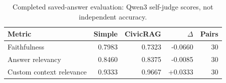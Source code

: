 \begin{table}[htbp]\centering\small
\caption{Completed saved-answer evaluation: Qwen3 self-judge scores, not independent accuracy.}\label{tab:ragas-final}
\begin{tabularx}{\linewidth}{Xrrrr}\toprule
Metric & Simple & CivicRAG & $\Delta$ & Pairs\\\midrule
Faithfulness & 0.7983 & 0.7323 & -0.0660 & 30\\
Answer relevancy & 0.8460 & 0.8375 & -0.0085 & 30\\
Custom context relevance & 0.9333 & 0.9667 & +0.0333 & 30\\
\bottomrule\end{tabularx}\end{table}

